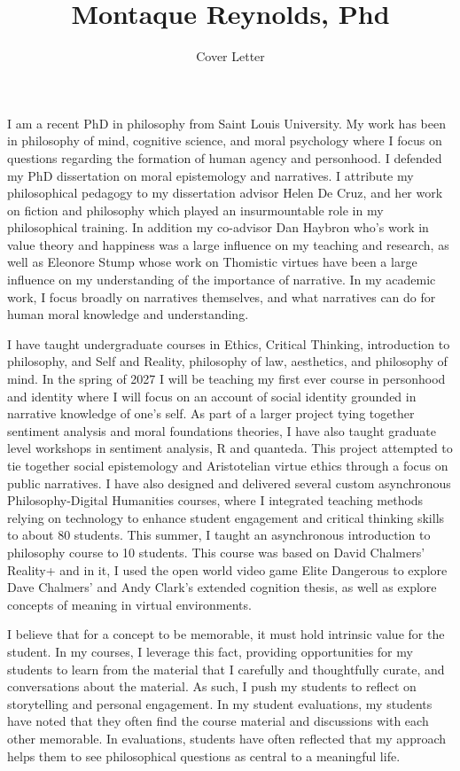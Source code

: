 \documentclass[
  letterpaper,
  DIV=11,
  numbers=noendperiod]{scrartcl}
\title{Montaque Reynolds, Phd}
\subtitle{Cover Letter}
\author{}
\date{}
\begin{document}
\maketitle


I am a recent PhD in philosophy from Saint Louis University. My work has
been in philosophy of mind, cognitive science, and moral psychology
where I focus on questions regarding the formation of human agency and
personhood. I defended my PhD dissertation on moral epistemology and
narratives. I attribute my philosophical pedagogy to my dissertation
advisor Helen De Cruz, and her work on fiction and philosophy which
played an insurmountable role in my philosophical training. In addition
my co-advisor Dan Haybron who's work in value theory and happiness was a
large influence on my teaching and research, as well as Eleonore Stump
whose work on Thomistic virtues have been a large influence on my
understanding of the importance of narrative. In my academic work, I
focus broadly on narratives themselves, and what narratives can do for
human moral knowledge and understanding.

I have taught undergraduate courses in Ethics, Critical Thinking,
introduction to philosophy, and Self and Reality, philosophy of law,
aesthetics, and philosophy of mind. In the spring of 2027 I will be
teaching my first ever course in personhood and identity where I will
focus on an account of social identity grounded in narrative knowledge
of one's self. As part of a larger project tying together sentiment
analysis and moral foundations theories, I have also taught graduate
level workshops in sentiment analysis, R and quanteda. This project
attempted to tie together social epistemology and Aristotelian virtue
ethics through a focus on public narratives. I have also designed and
delivered several custom asynchronous Philosophy-Digital Humanities
courses, where I integrated teaching methods relying on technology to
enhance student engagement and critical thinking skills to about 80
students. This summer, I taught an asynchronous introduction to
philosophy course to 10 students. This course was based on David
Chalmers' Reality+ and in it, I used the open world video game Elite
Dangerous to explore Dave Chalmers' and Andy Clark's extended cognition
thesis, as well as explore concepts of meaning in virtual environments.

I believe that for a concept to be memorable, it must hold intrinsic
value for the student. In my courses, I leverage this fact, providing
opportunities for my students to learn from the material that I
carefully and thoughtfully curate, and conversations about the material.
As such, I push my students to reflect on storytelling and personal
engagement. In my student evaluations, my students have noted that they
often find the course material and discussions with each other
memorable. In evaluations, students have often reflected that my
approach helps them to see philosophical questions as central to a
meaningful life.
\end{document}
